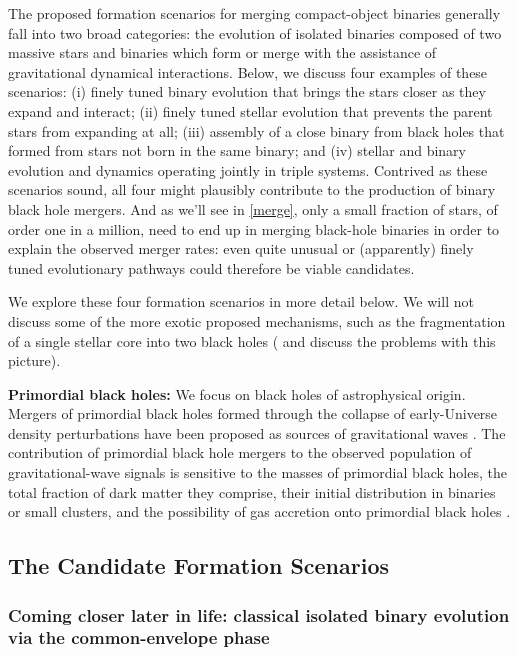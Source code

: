 \documentclass[review]{elsarticle}
\begin{document}
The proposed formation scenarios for merging compact-object binaries generally fall into two broad categories: the evolution of isolated binaries composed of two massive stars and binaries which form or merge with the assistance of gravitational dynamical interactions.  Below, we discuss four examples of these scenarios: (i) finely tuned binary evolution that brings the stars closer as they expand and interact; (ii) finely tuned stellar evolution that prevents the parent stars from expanding at all; (iii) assembly of a close binary from black holes that formed from stars not born in the same binary; and (iv) stellar and binary evolution and dynamics operating jointly in triple systems.   Contrived as these scenarios sound, all four might plausibly contribute to the production of binary black hole mergers.  And as we'll see in \autoref{merge}, only a small fraction of stars, of order one in a million, need to end up in merging black-hole binaries in order to explain the observed merger rates: even quite unusual or (apparently) finely tuned evolutionary pathways could therefore be viable candidates.

We explore these four formation scenarios in more detail below. We will not discuss some of the more exotic proposed mechanisms, such as the fragmentation of a single stellar core into two black holes \citep{Loeb:2016} (\citet{Woosley:2016} and \citet{Dai:2017} discuss the problems with this picture).  

\textbf{Primordial black holes:}  We focus on black holes of astrophysical origin.   Mergers of primordial black holes formed through the collapse of early-Universe density perturbations have been proposed as sources of gravitational waves \citep{Bird:2016}.   The contribution of primordial black hole mergers to the observed population of gravitational-wave signals is sensitive to the masses of primordial black holes, the total fraction of dark matter they comprise, their initial distribution in binaries or small clusters, and the possibility of gas accretion onto primordial black holes \citep{AliHaimoud:2017, ChenHuang:2018, Korol:2019, DeLuca:2020b, DeLuca:2020a}.

\subsection{The Candidate Formation Scenarios}
\subsubsection{Coming closer later in life: classical isolated binary evolution via the common-envelope phase}
\label{form:isol}
\end{document}
